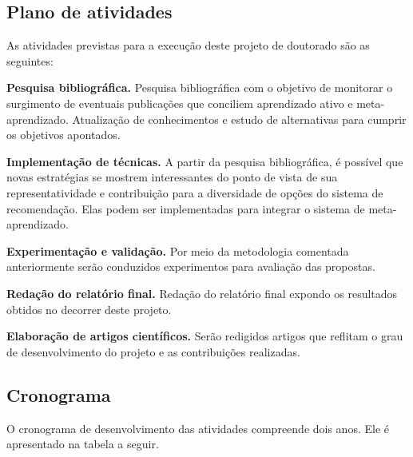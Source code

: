 \subsection{Plano de atividades}
As atividades previstas para a execução deste projeto de doutorado são as seguintes:

\begin{compactenum}

\item{\textbf{Pesquisa bibliográfica.} Pesquisa bibliográfica com o objetivo de
monitorar o surgimento de eventuais publicações que conciliem aprendizado ativo e meta-aprendizado. Atualização de conhecimentos e estudo de alternativas para cumprir os objetivos apontados.}

\item{\textbf{Implementação de técnicas.} A partir da pesquisa bibliográfica, é possível que novas estratégias se mostrem interessantes do ponto de 
vista de sua representatividade e contribuição para a diversidade de opções
do sistema de recomendação. Elas podem ser implementadas para integrar o sistema de meta-aprendizado.}

\item{\textbf{Experimentação e validação.} Por meio da metodologia comentada anteriormente serão conduzidos experimentos para avaliação das propostas.}

\item {\textbf{Redação do relatório final.} Redação do relatório final expondo os resultados obtidos no decorrer deste projeto.}

\item{\textbf{Elaboração de artigos científicos.} Serão redigidos artigos que reflitam o grau de desenvolvimento do projeto e as contribuições realizadas.}
\end{compactenum}

\subsection{Cronograma}\label{ssec:Cronograma}
O cronograma de desenvolvimento das atividades compreende dois anos.
Ele é apresentado na tabela a seguir.

\newcommand{\y}{\rule{13pt}{5pt}}
\newcommand{\x}{\hspace*{4pt}}
\setlength{\tabcolsep}{0pt}

